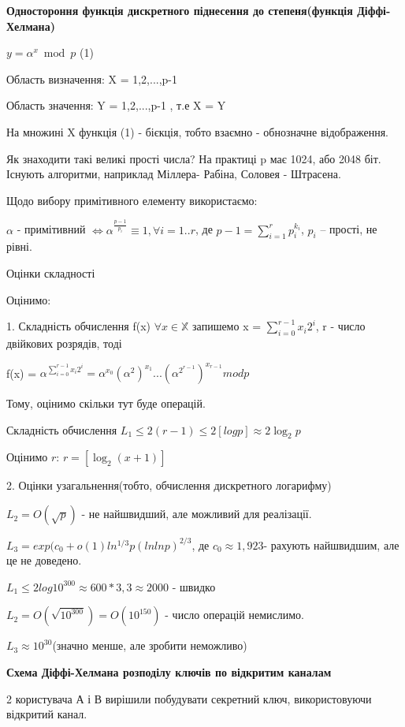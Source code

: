\textbf{Одностороння функція дискретного піднесення до степеня(функція Діффі-Хелмана)}

$y = \alpha^x \bmod p$       (1)

Область визначення: X = {1,2,...,p-1}

Область значення: Y = {1,2,...,p-1} , т.е X = Y

На множині X функція (1) - бієкція, тобто взаємно - обнозначне відображення.

Як знаходити такі великі прості числа? На практиці p  має 1024, або 2048 біт. Існують алгоритми, наприклад Міллера- Рабіна, Соловея - Штрасена.

Щодо вибору примітивного елементу використаємо:

$\alpha$ - примітивний $\Leftrightarrow \alpha^\frac{p-1}{p_{i}}\equiv 1, \forall i = 1..r$, 
де $p-1 = \sum_{i=1}^r p_i^{k_i}$, $p_{i}$ -- прості, не рівні.

Оцінки складності

Оцінимо:

1. Складність обчислення f(x) $\forall x \in \mathbb X $ запишемо x = $\sum_{i=0}^{r-1} x_i2^i $, r - число двійкових розрядів, тоді


f(x) = $\alpha^{\sum_{i=0}^{r-1} x_i2^i} = \alpha^{x_0}(\alpha^{2})^{x_1}...(\alpha^{2^{r-1}})^{x_{r-1}} mod p$

Тому, оцінимо скільки тут буде операцій.

Складність обчислення $L_1 \leq 2(r-1) \leq 2[log p] \approx 2\log_2 p$

Оцінимо $r$: $r = [\log_2(x+1)]$

2. Оцінки узагальнення(тобто, обчислення дискретного логарифму)

$L_2 = O( \sqrt{p})$ - не найшвидший, але можливий для реалізації.

$L_3 = exp{(c_0 + o(1)ln^{1/3}p(lnlnp)^{2/3}}$, де $c_0 \approx 1,923$- рахують найшвидшим, але це не доведено.


\begin{example}
$L_1  \leq 2log10^{300}\approx 600 * 3,3 \approx 2000$ - швидко

$L_2 = O(\sqrt{10^{300}}) = O(10^{150})$ - число операцій немислимо.

$L_3 \approx 10^{30}$(значно менше, але зробити неможливо)
\end{example}

\textbf{Схема Діффі-Хелмана розподілу ключів по відкритим каналам}

2 користувача А і В вирішили побудувати секретний ключ, використовуючи відкритий канал.

